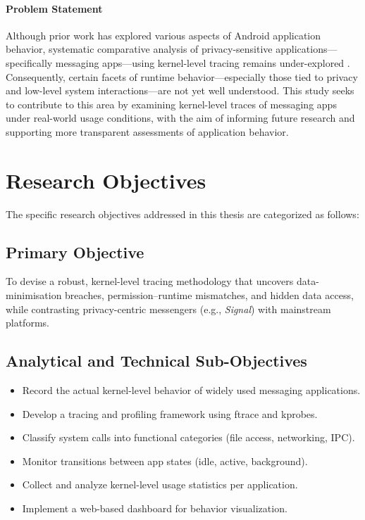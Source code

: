 \documentclass[a4paper,12pt]{report}
\begin{document}
\paragraph{Problem Statement}

Although prior work has explored various aspects of Android application behavior, systematic comparative analysis of privacy-sensitive applications—specifically messaging apps—using kernel-level tracing remains under-explored \cite{DynamicSecurityAnalysis2023}. Consequently, certain facets of runtime behavior—especially those tied to privacy and low-level system interactions—are not yet well understood. This study seeks to contribute to this area by examining kernel-level traces of messaging apps under real-world usage conditions, with the aim of informing future research and supporting more transparent assessments of application behavior.

\section{Research Objectives}

The specific research objectives addressed in this thesis are categorized as follows:

\subsection*{Primary Objective}

To devise a robust, kernel-level tracing methodology that uncovers data-minimisation breaches, permission–runtime mismatches, and hidden data access, while contrasting privacy-centric messengers (e.g., \textit{Signal}) with mainstream platforms.

\subsection*{Analytical and Technical Sub-Objectives}
\begin{itemize}
\item Record the actual kernel-level behavior of widely used messaging applications.
\item Develop a tracing and profiling framework using ftrace and kprobes.
\item Classify system calls into functional categories (file access, networking, IPC).
\item Monitor transitions between app states (idle, active, background).
\item Collect and analyze kernel-level usage statistics per application.
\item Implement a web-based dashboard for behavior visualization.
\end{itemize}
\end{document}
